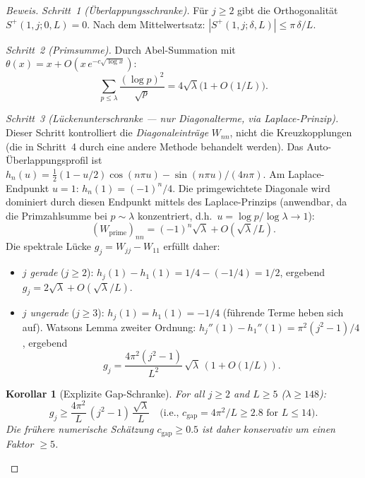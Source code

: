 \documentclass[12pt,a4paper]{article}
\newtheorem{corollary}[theorem]{Korollar}
\theoremstyle{definition}
\theoremstyle{remark}
\begin{document}
\begin{proof}[Beweis]
\emph{Schritt~1 (Überlappungsschranke).} Für $j \geq 2$ gibt die Orthogonalität $S^+(1,j;0,L) = 0$. Nach dem Mittelwertsatz: $|S^+(1,j;\delta,L)| \leq \pi\,\delta/L$.

\emph{Schritt~2 (Primsumme).} Durch Abel-Summation mit $\theta(x) = x + O(x\,e^{-c\sqrt{\log x}})$:
\[
  \sum_{p \leq \lambda}\frac{(\log p)^2}{\sqrt{p}} = 4\sqrt{\lambda}\bigl(1 + O(1/L)\bigr).
\]

\emph{Schritt~3 (Lückenunterschranke --- nur Diagonalterme, via Laplace-Prinzip).} Dieser Schritt kontrolliert die \emph{Diagonaleinträge} $W_{nn}$, nicht die Kreuzkopplungen (die in Schritt~4 durch eine andere Methode behandelt werden). Das Auto-Überlappungsprofil ist $h_n(u) = \tfrac{1}{2}(1-u/2)\cos(n\pi u) - \sin(n\pi u)/(4n\pi)$. Am Laplace-Endpunkt $u = 1$: $h_n(1) = (-1)^n/4$. Die primgewichtete Diagonale wird dominiert durch diesen Endpunkt mittels des Laplace-Prinzips (anwendbar, da die Primzahlsumme bei $p \sim \lambda$ konzentriert, d.h.\ $u = \log p / \log\lambda \to 1$):
\[
  (W_{\mathrm{prime}})_{nn} = (-1)^n\sqrt{\lambda} + O(\sqrt{\lambda}/L).
\]
Die spektrale Lücke $g_j = W_{jj} - W_{11}$ erfüllt daher:
\begin{itemize}
  \item \emph{$j$ gerade} ($j \geq 2$): $h_j(1) - h_1(1) = 1/4 - (-1/4) = 1/2$, ergebend $g_j = 2\sqrt{\lambda} + O(\sqrt{\lambda}/L)$.
  \item \emph{$j$ ungerade} ($j \geq 3$): $h_j(1) = h_1(1) = -1/4$ (führende Terme heben sich auf). Watsons Lemma zweiter Ordnung: $h_j''(1) - h_1''(1) = \pi^2(j^2-1)/4$, ergebend
  \begin{equation}
  \label{eq:gap-odd}
    g_j = \frac{4\pi^2(j^2-1)}{L^2}\,\sqrt{\lambda}\,(1 + O(1/L)).
  \end{equation}
\end{itemize}

\begin{corollary}[Explizite Gap-Schranke]
\label{cor:explicit-gap}
For all $j \geq 2$ and $L \geq 5$ ($\lambda \geq 148$):
\[
  g_j \geq \frac{4\pi^2}{L}\,(j^2 - 1)\,\frac{\sqrt{\lambda}}{L}
  \quad\text{(i.e., } c_{\mathrm{gap}} = 4\pi^2/L \geq 2.8 \text{ for } L \leq 14\text{)}.
\]
Die frühere numerische Schätzung $c_{\mathrm{gap}} \geq 0.5$ ist daher konservativ um einen Faktor $\geq 5$.
\end{corollary}


\end{proof}
\end{document}
